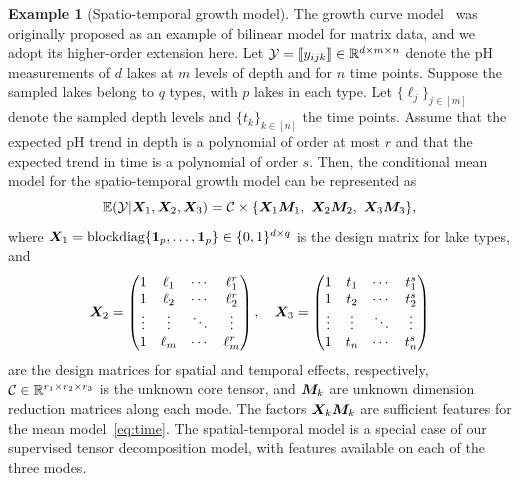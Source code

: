 \documentclass[10pt]{article}
\theoremstyle{definition}
\theoremstyle{definition}
\newtheorem{example}{Example}
\theoremstyle{definition}
\begin{document}
\begin{enumerate}
\begin{example}[Spatio-temporal growth model]
The growth curve model~\cite{gabriel1998generalised,srivastava2008models} was originally proposed as an example of bilinear model for matrix data, and we adopt its higher-order extension here. Let $\mathcal{Y}=\llbracket y_{ijk} \rrbracket\in\mathbb{R}^{d \times m\times n}$ denote the pH measurements of $d$ lakes at $m$ levels of depth and for $n$ time points. Suppose the sampled lakes belong to $q$ types, with $p$ lakes in each type. Let $\{\ell_j\}_{j\in[m]}$ denote the sampled depth levels and $\{t_k\}_{k\in[n]}$ the time points. Assume that the expected pH trend in depth is a polynomial of order at most $r$ and that the expected trend in time is a polynomial of order $s$. Then, the conditional mean model for the spatio-temporal growth model can be represented as
\begin{equation}\label{eq:time}
\mathbb{E}(\tY|\mX_1,\mX_2,\mX_3)=\tC\times\{\mX_1\mM_1,\ \mX_2\mM_2,\ \mX_3\mM_3\},
\end{equation}
where $\bm X_1=\text{blockdiag}\{\mathbf{1}_p,\ldots,\mathbf{1}_p\}\in \{0,1\}^{d\times q}$ is the design matrix for lake types, and
\[
\bm X_2=
\begin{pmatrix}
1 & \ell_1&\cdots &\ell^{r}_1\\
1 & \ell_2&\cdots &\ell^{r}_2\\
\vdots &\vdots&\ddots&\vdots\\
1&\ell_{m}&\cdots&\ell^{r}_{m}
\end{pmatrix},\quad
\bm X_3=
\begin{pmatrix}
1 & t_1&\cdots &t^{s}_1\\
1 & t_2&\cdots &t^{s}_2\\
\vdots &\vdots&\ddots&\vdots\\
1&t_{n}&\cdots&t^{s}_{n}
\end{pmatrix}
\]
are the design matrices for spatial and temporal effects, respectively, $\mathcal{C}\in\mathbb{R}^{r_1\times r_2\times r_3}$ is the unknown core tensor, and $\bm M_k$ are unknown dimension reduction matrices along each mode. The factors $\bm X_k\bm M_k$ are sufficient features for the mean model~\eqref{eq:time}. The spatial-temporal model is a special case of our supervised tensor decomposition model, with features available on each of the three modes.\\
\end{example}



\end{enumerate}
\end{document}
